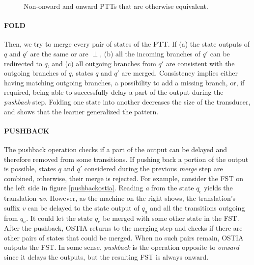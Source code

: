 \begin{figure}[h!] 
\centering
{}
%
\hspace{3em}
%
\caption{Non-onward and onward PTTs that are otherwise equivalent.}
\label{onwardgfsts}
\end{figure}



\paragraph{FOLD}

Then, we try to merge every pair of states of the PTT.
If (a) the state outputs of $q$ and $q'$ are the same or are $\perp$, (b) all the incoming branches of $q'$ can be redirected to $q$, and (c) all outgoing branches from $q'$ are consistent with the outgoing branches of $q$, states $q$ and $q'$ are merged.
Consistency implies either having matching outgoing branches, a possibility to add a missing branch, or, if required, being able to successfully delay a part of the output during the \emph{pushback} step.
Folding one state into another decreases the size of the transducer, and shows that the learner generalized the pattern.


\paragraph{PUSHBACK}

The pushback operation checks if a part of the output can be delayed and therefore removed from some transitions.
If pushing back a portion of the output is possible, states $q$ and $q'$ considered during the previous \emph{merge} step are combined, otherwise, their merge is rejected.
For example, consider the FST on the left side in figure \ref{pushbackostia}.
Reading \emph{a} from the state $q_\epsilon$ yields the translation \emph{uv}.
However, as the machine on the right shows, the translation's suffix \emph{v} can be delayed to the state output of $q_a$ and all the transitions outgoing from $q_a$.
It could let the state $q_e$ be merged with some other state in the FST.
After the pushback, OSTIA returns to the merging step and checks if there are other pairs of states that could be merged.
When no such pairs remain, OSTIA outputs the FST.
In some sense, \emph{pushback} is the operation opposite to \emph{onward} since it delays the outputs, but the resulting FST is always onward.

